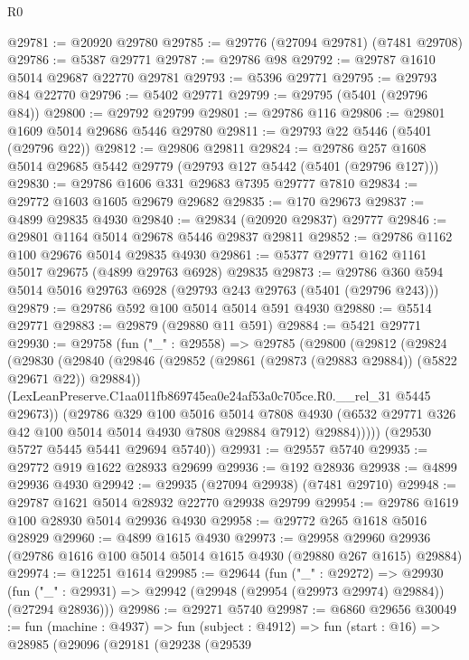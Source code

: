 \begin{lexlean}{R0}
\begin{coremodule}
@29781 := @20920 @29780
@29785 := @29776 (@27094 @29781) (@7481 @29708)
@29786 := @5387 @29771
@29787 := @29786 @98
@29792 := @29787 @1610 @5014 @29687 @22770 @29781
@29793 := @5396 @29771
@29795 := @29793 @84 @22770
@29796 := @5402 @29771
@29799 := @29795 (@5401 (@29796 @84))
@29800 := @29792 @29799
@29801 := @29786 @116
@29806 := @29801 @1609 @5014 @29686 @5446 @29780
@29811 := @29793 @22 @5446 (@5401 (@29796 @22))
@29812 := @29806 @29811
@29824 := @29786 @257 @1608 @5014 @29685 @5442 @29779 (@29793 @127 @5442 (@5401 (@29796 @127)))
@29830 := @29786 @1606 @331 @29683 @7395 @29777 @7810
@29834 := @29772 @1603 @1605 @29679 @29682
@29835 := @170 @29673
@29837 := @4899 @29835 @4930
@29840 := @29834 (@20920 @29837) @29777
@29846 := @29801 @1164 @5014 @29678 @5446 @29837 @29811
@29852 := @29786 @1162 @100 @29676 @5014 @29835 @4930
@29861 := @5377 @29771 @162 @1161 @5017 @29675 (@4899 @29763 @6928) @29835
@29873 := @29786 @360 @594 @5014 @5016 @29763 @6928 (@29793 @243 @29763 (@5401 (@29796 @243)))
@29879 := @29786 @592 @100 @5014 @5014 @591 @4930
@29880 := @5514 @29771
@29883 := @29879 (@29880 @11 @591)
@29884 := @5421 @29771
@29930 := @29758
    (fun ("_" : @29558) =>
    @29785
      (@29800
        (@29812
          (@29824
            (@29830
              (@29840
                (@29846 (@29852 (@29861 (@29873 (@29883 @29884)) (@5822 @29671 @22)) @29884))
                (LexLeanPreserve.C1aa011fb869745ea0e24af53a0c705ce.R0.__rel_31 @5445 @29673))
              (@29786
                @329
                @100
                @5016
                @5014
                @7808
                @4930
                (@6532 @29771 @326 @42 @100 @5014 @5014 @4930 @7808 @29884 @7912)
                @29884)))))
      (@29530 @5727 @5445 @5441 @29694 @5740))
@29931 := @29557 @5740
@29935 := @29772 @919 @1622 @28933 @29699
@29936 := @192 @28936
@29938 := @4899 @29936 @4930
@29942 := @29935 (@27094 @29938) (@7481 @29710)
@29948 := @29787 @1621 @5014 @28932 @22770 @29938 @29799
@29954 := @29786 @1619 @100 @28930 @5014 @29936 @4930
@29958 := @29772 @265 @1618 @5016 @28929
@29960 := @4899 @1615 @4930
@29973 := @29958
    @29960
    @29936
    (@29786 @1616 @100 @5014 @5014 @1615 @4930 (@29880 @267 @1615) @29884)
@29974 := @12251 @1614
@29985 := @29644
    (fun ("_" : @29272) =>
    @29930 (fun ("_" : @29931) => @29942 (@29948 (@29954 (@29973 @29974) @29884)) (@27294 @28936)))
@29986 := @29271 @5740
@29987 := @6860 @29656
@30049 := fun (machine : @4937) =>
  fun (subject : @4912) =>
  fun (start : @16) =>
  @28985
    (@29096
      (@29181
        (@29238
          (@29539

\end{coremodule}
\end{lexlean}
